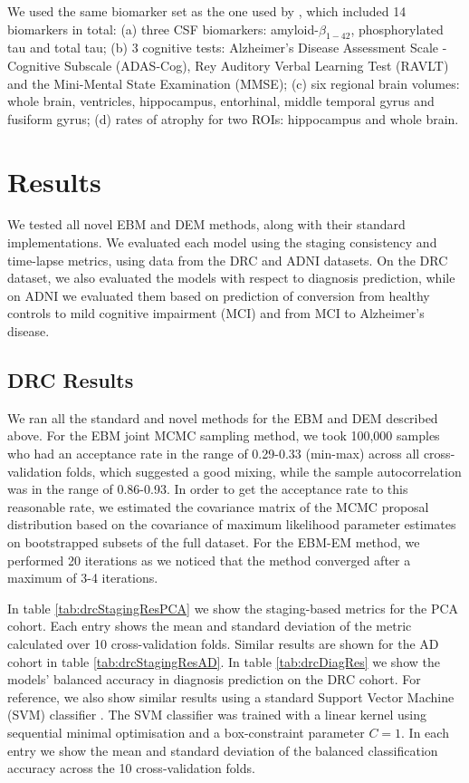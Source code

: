 We used the same biomarker set as the one used by \cite{young2014data}, which included 14 biomarkers in total: (a) three CSF biomarkers: amyloid-$\beta_{1-42}$, phosphorylated tau and total tau; (b) 3 cognitive tests: Alzheimer's Disease Assessment Scale - Cognitive Subscale (ADAS-Cog), Rey Auditory Verbal Learning Test (RAVLT) and the Mini-Mental State Examination (MMSE); (c) six regional brain volumes: whole brain, ventricles, hippocampus, entorhinal, middle temporal gyrus and fusiform gyrus; (d) rates of atrophy for two ROIs: hippocampus and whole brain.

\section{Results}
\label{sec:perfRes}

We tested all novel EBM and DEM methods, along with their standard implementations. We evaluated each model using the staging consistency and time-lapse metrics, using data from the DRC and ADNI datasets. On the DRC dataset, we also evaluated the models with respect to diagnosis prediction, while on ADNI we evaluated them based on prediction of conversion from healthy controls to mild cognitive impairment (MCI) and from MCI to Alzheimer's disease.

\subsection{DRC Results}
\label{sec:perfResDrc}

We ran all the standard and novel methods for the EBM and DEM described above. For the EBM joint MCMC sampling method, we took 100,000 samples who had an acceptance rate in the range of 0.29-0.33 (min-max) across all cross-validation folds, which suggested a good mixing, while the sample autocorrelation was in the range of 0.86-0.93. In order to get the acceptance rate to this reasonable rate, we estimated the covariance matrix  of the MCMC proposal distribution based on the covariance of maximum likelihood parameter estimates on bootstrapped subsets of the full dataset. For the EBM-EM method, we performed 20 iterations as we noticed that the method converged after a maximum of 3-4 iterations.

In table \ref{tab:drcStagingResPCA} we show the staging-based metrics for the PCA cohort. Each entry shows the mean and standard deviation of the metric calculated over 10 cross-validation folds. Similar results are shown for the AD cohort in table \ref{tab:drcStagingResAD}. In table \ref{tab:drcDiagRes} we show the models' balanced accuracy in diagnosis prediction on the DRC cohort. For reference, we also show similar results using a standard Support Vector Machine (SVM) classifier \cite{vapnik2006estimation}. The SVM classifier was trained with a linear kernel using sequential minimal optimisation \cite{platt1998sequential} and a box-constraint parameter $C=1$. In each entry we show the mean and standard deviation of the balanced classification accuracy across the 10 cross-validation folds. 

